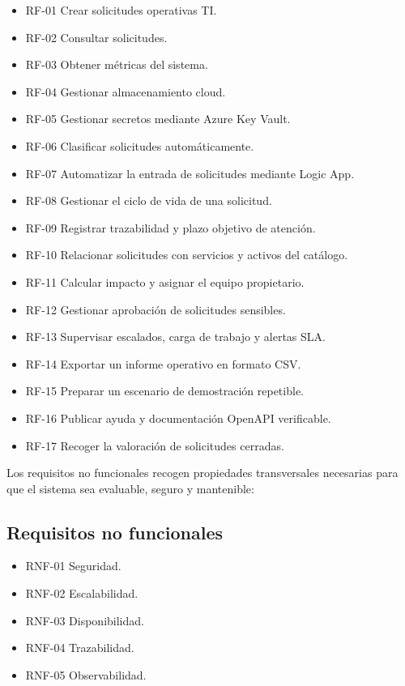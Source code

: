 \begin{itemize}
    \item RF-01 Crear solicitudes operativas TI.
    \item RF-02 Consultar solicitudes.
    \item RF-03 Obtener métricas del sistema.
    \item RF-04 Gestionar almacenamiento cloud.
    \item RF-05 Gestionar secretos mediante Azure Key Vault.
    \item RF-06 Clasificar solicitudes automáticamente.
    \item RF-07 Automatizar la entrada de solicitudes mediante Logic App.
    \item RF-08 Gestionar el ciclo de vida de una solicitud.
    \item RF-09 Registrar trazabilidad y plazo objetivo de atención.
    \item RF-10 Relacionar solicitudes con servicios y activos del catálogo.
    \item RF-11 Calcular impacto y asignar el equipo propietario.
    \item RF-12 Gestionar aprobación de solicitudes sensibles.
    \item RF-13 Supervisar escalados, carga de trabajo y alertas SLA.
    \item RF-14 Exportar un informe operativo en formato CSV.
    \item RF-15 Preparar un escenario de demostración repetible.
    \item RF-16 Publicar ayuda y documentación OpenAPI verificable.
    \item RF-17 Recoger la valoración de solicitudes cerradas.
\end{itemize}

Los requisitos no funcionales recogen propiedades transversales necesarias para que el sistema sea evaluable, seguro y mantenible:

\subsection{Requisitos no funcionales}

\begin{itemize}
    \item RNF-01 Seguridad.
    \item RNF-02 Escalabilidad.
    \item RNF-03 Disponibilidad.
    \item RNF-04 Trazabilidad.
    \item RNF-05 Observabilidad.
\end{itemize}


